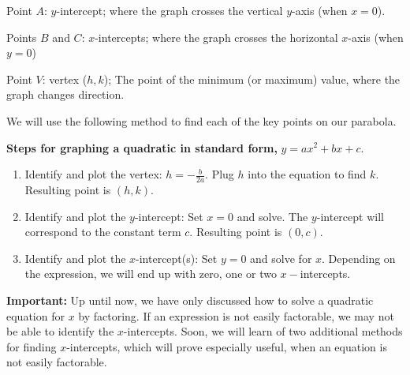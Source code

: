 \documentclass[12pt]{book}
\theoremstyle{definition}
\begin{document}
\begin{multicols}{2}
\begin{center}
\end{center}

\columnbreak
  Point $A$: $y$-intercept; where the graph crosses the vertical $y$-axis (when $x=0$).\par  
  Points $B$ and $C$: $x$-intercepts; where the graph crosses the horizontal $x$-axis (when $y=0$)\par
  Point $V$: vertex ($h,k$); The point of the minimum (or maximum) value, where the graph changes direction.
\end{multicols}
We will use the following method to find each of the key points on our parabola.
\begin{center}
  {\bf Steps for graphing a quadratic in standard form,} $y = a x^2 + b x + c$.
\end{center}
\begin{enumerate}
  \item Identify and plot the vertex: $h = -\displaystyle\frac{b}{2 a}$. Plug $h$ into the equation to find $k$.  Resulting point is $(h,k)$.
  \item Identify and plot the $y$-intercept: Set $x = 0$ and solve.  The $y$-intercept will correspond to the constant term $c$.  Resulting point is $(0,c)$.
  \item Identify and plot the $x$-intercept(s): Set $y = 0$ and solve for $x$.  Depending on the expression, we will end up with zero, one or two $x-$intercepts.
\end{enumerate}
{\bf Important:} Up until now, we have only discussed how to solve a quadratic equation for $x$ by factoring.  If an expression is not easily factorable, we may not be able to identify the $x$-intercepts.  Soon, we will learn of two additional methods for finding $x$-intercepts, which will prove especially useful, when an equation is not easily factorable.\par
\end{document}
